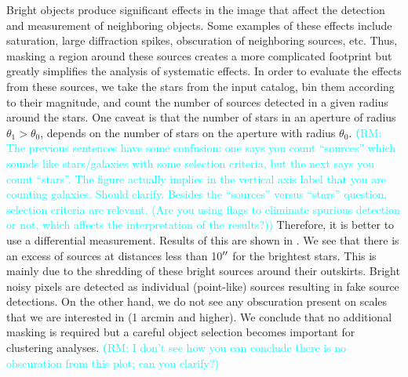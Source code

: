\documentclass[twocolumn]{aastex62}
\newcommand{\rachel}[1]{{\textcolor{cyan}{{\textbf (RM: #1)}}}}
\begin{document}
Bright objects produce significant effects in the image that affect the detection and measurement of neighboring objects. Some examples of these effects include saturation, large diffraction spikes, obscuration of neighboring sources, etc. Thus, masking a region around these sources creates a more complicated footprint but greatly simplifies the analysis of systematic effects. In order to evaluate the effects from these sources, we take the stars from the input catalog, bin them according to their magnitude, and count the number of sources detected in a given radius around the stars. One caveat is that the number of stars in an aperture of radius $\theta_{1} > \theta_{0}$, depends on the number of stars on the aperture with radius $\theta_{0}$. \rachel{The previous sentences have some confusion: one says you count ``sources'' which sounds like stars/galaxies with some selection criteria, but the next says you count ``stars''.  The figure actually implies in the vertical axis label that you are counting galaxies.  Should clarify.  Besides the ``sources'' versus ``stars'' question, selection criteria are relevant. (Are you using flags to eliminate spurious detection or not, which affects the interpretation of  the results?)} Therefore, it is better to use a differential measurement. Results of this are shown in . We see that there is an excess of sources at distances less than 10$\mbox{$^{\prime\prime}$}$ for the brightest stars. This is mainly due to the shredding of these bright sources around their outskirts. Bright noisy pixels are detected as individual (point-like) sources resulting in fake source detections. On the other hand, we do not see any obscuration present on scales that we are interested in (1 arcmin and higher). We conclude that no additional masking is required but a careful object selection becomes important for clustering analyses. \rachel{I don't see how you can conclude there is no obscuration from this plot; can you clarify?}
\end{document}
